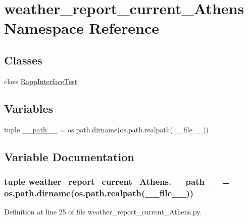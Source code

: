 \hypertarget{namespaceweather__report__current__Athens}{\section{weather\-\_\-report\-\_\-current\-\_\-\-Athens Namespace Reference}
\label{namespaceweather__report__current__Athens}
}
\subsection*{Classes}
\begin{DoxyCompactItemize}
\item 
class \hyperlink{classweather__report__current__Athens_1_1RappInterfaceTest}{Rapp\-Interface\-Test}
\end{DoxyCompactItemize}
\subsection*{Variables}
\begin{DoxyCompactItemize}
\item 
tuple \hyperlink{namespaceweather__report__current__Athens_a04c4e387eff5c138793b2509869a00c3}{\-\_\-\-\_\-path\-\_\-\-\_\-} = os.\-path.\-dirname(os.\-path.\-realpath(\-\_\-\-\_\-file\-\_\-\-\_\-))
\end{DoxyCompactItemize}


\subsection{Variable Documentation}
\hypertarget{namespaceweather__report__current__Athens_a04c4e387eff5c138793b2509869a00c3}{
\subsubsection[{\-\_\-\-\_\-path\-\_\-\-\_\-}]{\setlength{\rightskip}{0pt plus 5cm}tuple weather\-\_\-report\-\_\-current\-\_\-\-Athens.\-\_\-\-\_\-path\-\_\-\-\_\- = os.\-path.\-dirname(os.\-path.\-realpath(\-\_\-\-\_\-file\-\_\-\-\_\-))}}\label{namespaceweather__report__current__Athens_a04c4e387eff5c138793b2509869a00c3}


Definition at line 25 of file weather\-\_\-report\-\_\-current\-\_\-\-Athens.\-py.

